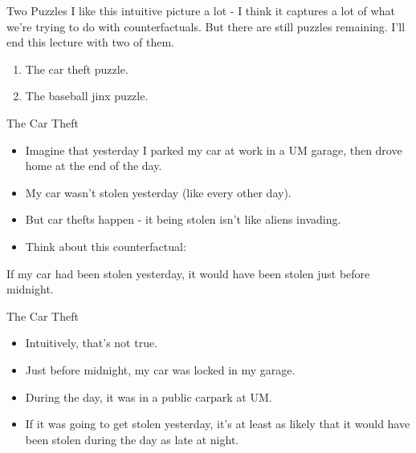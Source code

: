 \documentclass[
  ignorenonframetext,
]{beamer}
\providecommand{\tightlist}{%
  \setlength{\itemsep}{0pt}\setlength{\parskip}{0pt}}
\renewcommand{\,}{\text{, }}
\renewenvironment*{quote}	
	{\list{}{\rightmargin   \leftmargin} \item } 	
	{\endlist }
\begin{document}
\begin{frame}{Two Puzzles}
\protect\hypertarget{two-puzzles}{}
I like this intuitive picture a lot - I think it captures a lot of what
we're trying to do with counterfactuals. But there are still puzzles
remaining. I'll end this lecture with two of them.

\begin{enumerate}
\tightlist
\item
  The car theft puzzle.
\item
  The baseball jinx puzzle.
\end{enumerate}
\end{frame}

\begin{frame}{The Car Theft}
\protect\hypertarget{the-car-theft}{}
\begin{itemize}
\tightlist
\item
  Imagine that yesterday I parked my car at work in a UM garage, then
  drove home at the end of the day.
\item
  My car wasn't stolen yesterday (like every other day).
\item
  But car thefts happen - it being stolen isn't like aliens invading.
  \pause 
\item
  Think about this counterfactual:
\end{itemize}

\begin{quote}
If my car had been stolen yesterday, it would have been stolen just
before midnight.
\end{quote}
\end{frame}

\begin{frame}{The Car Theft}
\protect\hypertarget{the-car-theft-1}{}
\begin{itemize}
\tightlist
\item
  Intuitively, that's not true.
\item
  Just before midnight, my car was locked in my garage.
\item
  During the day, it was in a public carpark at UM.
\item
  If it was going to get stolen yesterday, it's at least as likely that
  it would have been stolen during the day as late at night.
\end{itemize}
\end{frame}
\end{document}
